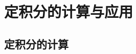 \section{定积分的计算与应用}

\subsection{定积分的计算}




















\begin{example}
    
\end{example}

\begin{solution}
    
\end{solution}




\begin{example}
    
\end{example}

\begin{solution}
    
\end{solution}





\begin{example}
    
\end{example}

\begin{solution}
    
\end{solution}



\begin{example}
    
\end{example}

\begin{solution}
    
\end{solution}





